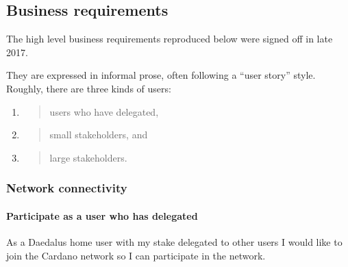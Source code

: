 \documentclass[11pt,a4paper]{article}
\begin{document}
\subsection{Business requirements}
\label{business-requirements}

The high level business requirements reproduced below were signed
off in late 2017.

They are expressed in informal prose, often following a ``user story''
style. Roughly, there are three kinds of users:

\begin{enumerate}
\def\labelenumi{\arabic{enumi}.}
\item
  \begin{quote}
  users who have delegated,
  \end{quote}
\item
  \begin{quote}
  small stakeholders, and
  \end{quote}
\item
  \begin{quote}
  large stakeholders.
  \end{quote}
\end{enumerate}

\subsubsection{Network connectivity}
\label{network-connectivity}

\paragraph{Participate as a user who has delegated}

As a Daedalus home user with my stake delegated to other users I would
like to join the Cardano network so I can participate in the network.
\end{document}
